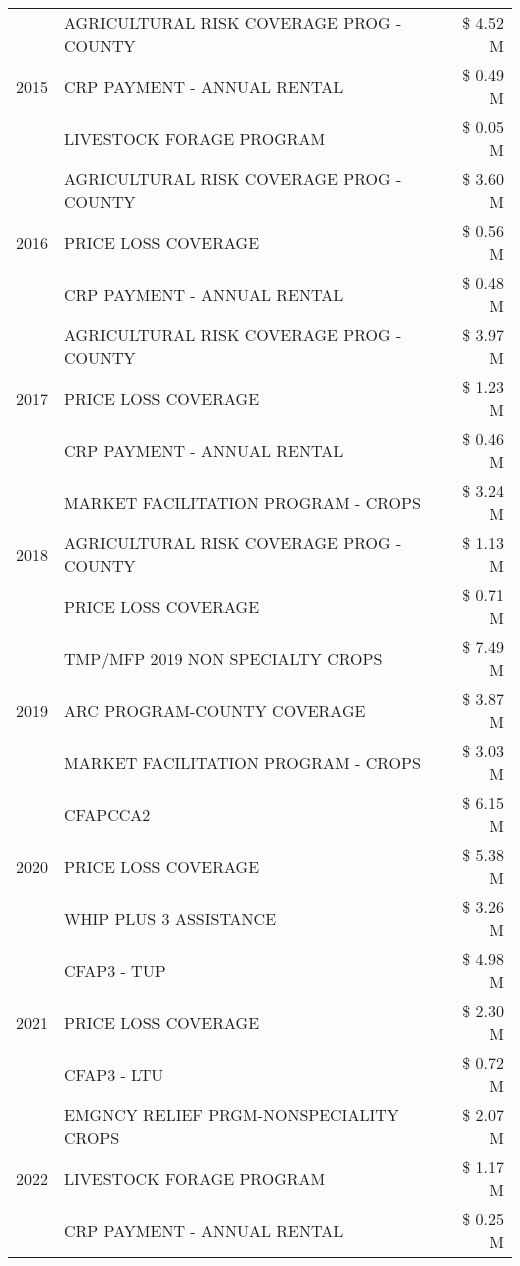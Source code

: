 \begin{tabular}{llr}
\cline{1-3}
\multirow[t]{3}{*}{2015} & AGRICULTURAL RISK COVERAGE PROG - COUNTY & \$ 4.52 M \\
 & CRP PAYMENT - ANNUAL RENTAL & \$ 0.49 M \\
 & LIVESTOCK FORAGE PROGRAM & \$ 0.05 M \\
\cline{1-3}
\multirow[t]{3}{*}{2016} & AGRICULTURAL RISK COVERAGE PROG - COUNTY & \$ 3.60 M \\
 & PRICE LOSS COVERAGE & \$ 0.56 M \\
 & CRP PAYMENT - ANNUAL RENTAL & \$ 0.48 M \\
\cline{1-3}
\multirow[t]{3}{*}{2017} & AGRICULTURAL RISK COVERAGE PROG - COUNTY & \$ 3.97 M \\
 & PRICE LOSS COVERAGE & \$ 1.23 M \\
 & CRP PAYMENT - ANNUAL RENTAL & \$ 0.46 M \\
\cline{1-3}
\multirow[t]{3}{*}{2018} & MARKET FACILITATION PROGRAM - CROPS & \$ 3.24 M \\
 & AGRICULTURAL RISK COVERAGE PROG - COUNTY & \$ 1.13 M \\
 & PRICE LOSS COVERAGE & \$ 0.71 M \\
\cline{1-3}
\multirow[t]{3}{*}{2019} & TMP/MFP 2019 NON SPECIALTY CROPS & \$ 7.49 M \\
 & ARC PROGRAM-COUNTY COVERAGE & \$ 3.87 M \\
 & MARKET FACILITATION PROGRAM - CROPS & \$ 3.03 M \\
\cline{1-3}
\multirow[t]{3}{*}{2020} & CFAPCCA2 & \$ 6.15 M \\
 & PRICE LOSS COVERAGE & \$ 5.38 M \\
 & WHIP PLUS 3 ASSISTANCE & \$ 3.26 M \\
\cline{1-3}
\multirow[t]{3}{*}{2021} & CFAP3 - TUP & \$ 4.98 M \\
 & PRICE LOSS COVERAGE & \$ 2.30 M \\
 & CFAP3 - LTU & \$ 0.72 M \\
\cline{1-3}
\multirow[t]{3}{*}{2022} & EMGNCY RELIEF PRGM-NONSPECIALITY CROPS & \$ 2.07 M \\
 & LIVESTOCK FORAGE PROGRAM & \$ 1.17 M \\
 & CRP PAYMENT - ANNUAL RENTAL & \$ 0.25 M \\
\cline{1-3}
\bottomrule
\end{tabular}
